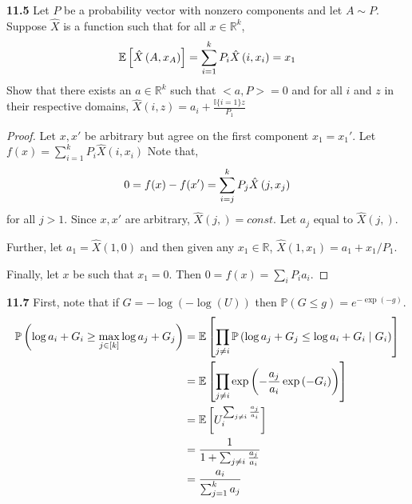 \noindent\textbf{11.5} Let $P$ be a probability vector with nonzero components and let $A\sim P$. Suppose $\hat{X}$ is a function such that for all $x\in \mathbb{R}^k$,
\begin{equation}
    \mathbb{E}\left[\hat{X}\left(A, x_{A}\right)\right]=\sum_{i=1}^{k} P_{i} \hat{X}\left(i, x_{i}\right)=x_{1}\notag
\end{equation}
Show that there exists an $a\in \mathbb{R}^k$ such that $<a,P>=0$ and for all $i$ and $z$ in their respective domains, $\hat{X}(i, z)=a_{i}+\frac{\mathbb{I}\{i=1\} z}{P_{1}}$
\begin{proof}
    Let $x, x'$ be arbitrary but agree on the first component $x_1=x_1'$. Let $f(x)=\sum_{i=1}^{k} P_{i} \hat{X}\left(i, x_{i}\right)$ Note that,
    \begin{equation}
        0=f(x)-f(x')=\sum_{i=j}^{k} P_{j} \hat{X}\left(j, x_{j}\right)\notag
    \end{equation}
    for all $j>1$. Since $x, x'$ are arbitrary, $\hat{X}(j, )=const$. Let $a_j$ equal to $\hat{X}(j, )$.
    \par Further, let $a_1=\hat{X}(1, 0)$ and then given any $x_1\in \mathbb{R}$, $\hat{X}\left(1, x_{1}\right)=a_{1}+x_{1} / P_{1}$.
    \par Finally, let $x$ be such that $x_1=0$. Then $0=f(x)=\sum_{i} P_{i} a_{i}$.
\end{proof}

\noindent\textbf{11.7} First, note that if $G=-\log (-\log (U))$ then $\mathbb{P}(G \leq g)=e^{-\exp (-g)}$.
\begin{equation}
    \begin{aligned}
        \mathbb{P}\left(\log a_{i}+G_{i} \geq \max _{j \in[k]} \log a_{j}+G_{j}\right) &=\mathbb{E}\left[\prod_{j \neq i} \mathbb{P}\left(\log a_{j}+G_{j} \leq \log a_{i}+G_{i} \mid G_{i}\right)\right] \notag\\
        &=\mathbb{E}\left[\prod_{j \neq i} \exp \left(-\frac{a_{j}}{a_{i}} \exp \left(-G_{i}\right)\right)\right] \notag\\
        &=\mathbb{E}\left[U_{i}^{\sum_{j \neq i} \frac{a_{j}}{a_{i}}}\right] \notag\\
        &=\frac{1}{1+\sum_{j \neq i} \frac{a_{j}}{a_{i}}} \notag\\
        &=\frac{a_{i}}{\sum_{j=1}^{k} a_{j}}\notag
        \end{aligned}
\end{equation}

